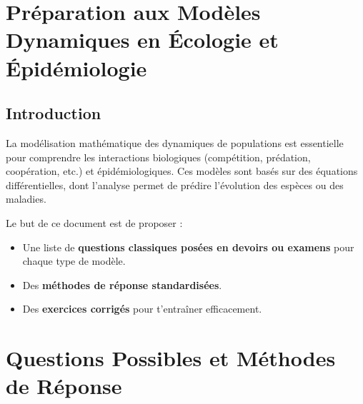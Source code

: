 \documentclass{article}
\begin{document}
\justifying

\section*{Préparation aux Modèles Dynamiques en Écologie et Épidémiologie}

\subsection*{Introduction}

La modélisation mathématique des dynamiques de populations est essentielle pour comprendre les interactions biologiques (compétition, prédation, coopération, etc.) et épidémiologiques. Ces modèles sont basés sur des équations différentielles, dont l'analyse permet de prédire l'évolution des espèces ou des maladies.

Le but de ce document est de proposer :
\begin{itemize}
  \item Une liste de \textbf{questions classiques posées en devoirs ou examens} pour chaque type de modèle.
  \item Des \textbf{méthodes de réponse standardisées}.
  \item Des \textbf{exercices corrigés} pour t'entraîner efficacement.
\end{itemize}

\section*{Questions Possibles et Méthodes de Réponse}
\end{document}
